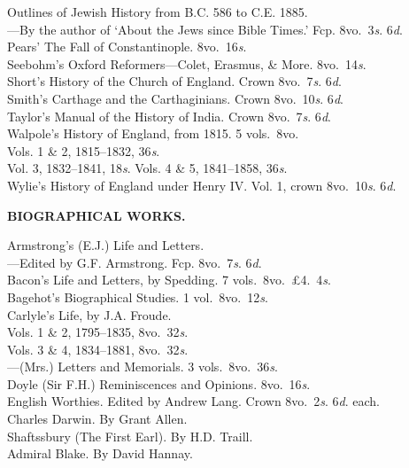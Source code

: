 \documentclass[letterpaper,12pt,oneside,openany]{memoir}
\newcommand{\D}{\hspace*{5mm}}
\newcommand{\E}{\hspace*{2mm}---\hspace*{2mm}}
\begin{document}
\begin{footnotesize}
Outlines of Jewish History from B.C. 586 to C.E. 1885. \\
\E By the author of `About the Jews since Bible Times.' Fcp. 8vo.\ 3\textit{s}. 6\textit{d}.\\
Pears' The Fall of Constantinople. 8vo.\ 16\textit{s}.\\
Seebohm's Oxford Reformers---Colet, Erasmus, \& More. 8vo.\ 14\textit{s}.\\
Short's History of the Church of England. Crown 8vo.\ 7\textit{s}. 6\textit{d}.\\
Smith's Carthage and the Carthaginians. Crown 8vo.\ 10\textit{s}. 6\textit{d}.\\
Taylor's Manual of the History of India. Crown 8vo.\ 7\textit{s}. 6\textit{d}.\\
Walpole's History of England, from 1815. 5 vols.\ 8vo.\ \\
\D Vols. 1 \& 2, 1815--1832, 36\textit{s}.\\
\D Vol. 3, 1832--1841, 18\textit{s}. Vols. 4 \& 5, 1841--1858, 36\textit{s}.\\
Wylie's History of England under Henry IV\@. Vol. 1, crown 8vo.\ 10\textit{s}. 6\textit{d}.
\begin{center}
\textbf{BIOGRAPHICAL WORKS.}
\end{center}
Armstrong's (E.J.) Life and Letters.\\
\E Edited by G.F. Armstrong. Fcp. 8vo.\ 7\textit{s}. 6\textit{d}.\\
Bacon's Life and Letters, by Spedding. 7 vols.\ 8vo.\ \pounds4.\ 4\textit{s}.\\
Bagehot's Biographical Studies. 1 vol.\ 8vo.\ 12\textit{s}.\\
Carlyle's Life, by J.A. Froude. \\
\D Vols. 1 \& 2, 1795--1835, 8vo.\ 32\textit{s}.\\
\D Vols. 3 \& 4, 1834--1881, 8vo.\ 32\textit{s}.\\
\E (Mrs.) Letters and Memorials. 3 vols.\ 8vo.\ 36\textit{s}.\\
Doyle (Sir F.H.) Reminiscences and Opinions. 8vo.\ 16\textit{s}.\\
English Worthies. Edited by Andrew Lang. Crown 8vo.\ 2\textit{s}. 6\textit{d}. each.\\
\D Charles Darwin. By Grant Allen.\\
\D Shaftssbury (The First Earl). By H.D. Traill.\\
\D Admiral Blake. By David Hannay.\\

\end{footnotesize}
\end{document}
